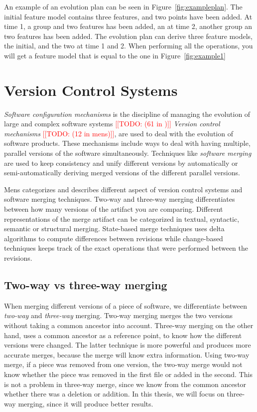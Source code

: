 \documentclass[a4paper,english]{ifimaster}
\newcommand{\todo}[1]{\textcolor{red}{[[TODO: #1]]}\PackageWarning{TODO:}{#1!}}
\begin{document}
An example of an evolution plan can be seen in Figure~\ref{fig:exampleplan}. The initial feature model contains three features, and two points have been added. At time 1, a group and two features has been added, an at time 2, another group an two features has been added. The evolution plan can derive three feature models, the initial, and the two at time 1 and 2. When performing all the operations, you will get a feature model that is equal to the one in Figure~\ref{fig:example1}

\section{Version Control Systems}%
\label{sec:version_control_systems}

\textit{Software configuration mechanisms} is the discipline of managing the evolution of large and complex software systems \todo{(61 in \cite{cite:tom_mens_software_merging_survey})} \textit{Version control mechanisms} \todo{(12 in mens)}, are used to deal with the evolution of software products. These mechanisms include ways to deal with having multiple, parallel versions of the software simultaneously. Techniques like \textit{software merging} are used to keep consistency and unify different versions by automatically or semi-automatically deriving merged versions of the different parallel versions.

Mens \cite{cite:tom_mens_software_merging_survey} categorizes and describes different aspect of version control systems and software merging techniques. Two-way and three-way merging differentiates between how many versions of the artifact you are comparing. Different representations of the merge artifact can be categorized in textual, syntactic, semantic or structural merging. State-based merge techniques uses delta algorithms to compute differences between revisions while change-based techniques keeps track of the exact operations that were performed between the revisions.

\subsection{Two-way vs three-way merging}%
\label{sub:two_way_vs_three_way_merging}

When merging different versions of a piece of software, we differentiate between \textit{two-way} and \textit{three-way} merging. Two-way merging merges the two versions without taking a common ancestor into account. Three-way merging on the other hand, uses a common ancestor as a reference point, to know how the different versions were changed. The latter technique is more powerful and produces more accurate merges, because the merge will know extra information. Using two-way merge, if a piece was removed from one version, the two-way merge would not know whether the piece was removed in the first file or added in the second. This is not a problem in three-way merge, since we know from the common ancestor whether there was a deletion or addition. In this thesis, we will focus on three-way merging, since it will produce better results.
\end{document}
